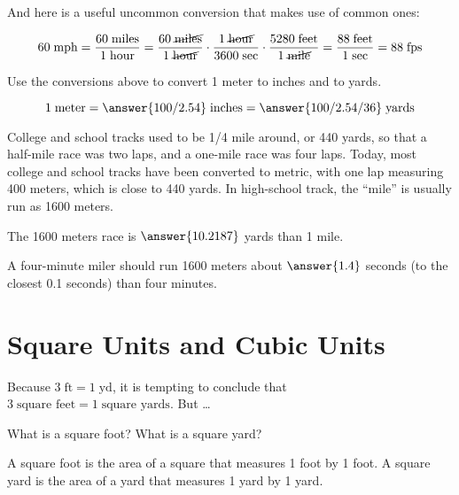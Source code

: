 \documentclass[nooutcomes]{ximera}
\begin{document}
And here is a useful uncommon conversion that makes use of common ones: 

\[
60\;\textrm{mph} = \frac{60\;\textrm{miles}}{1\;\textrm{hour}} 
=  \frac{60\;\cancel{\textrm{miles}}}{1\;\cancel{\textrm{hour}}} \cdot \frac{1\;\cancel{\textrm{hour}}}{3600\;\textrm{sec}} \cdot 
\frac{5280\;\textrm{feet}}{{1\;\cancel{\textrm{mile}}}} = \frac{88\;\textrm{feet}}{1\;\textrm{sec}} = 88\;\textrm{fps}
\]

\begin{question}
Use the conversions above to convert 1 meter to inches and to yards. 

\[
1\;\textrm{meter} = \answer{100/2.54}\;\textrm{inches} = \answer{100/2.54/36}\;\textrm{yards}
\] 

\end{question}

\begin{question}
College and school tracks used to be 1/4 mile around, or 440 yards, so that a half-mile race was two laps, and a one-mile race was four laps.  Today, most college and school tracks have been converted to metric, with one lap measuring 400 meters, which is close to 440 yards.  In high-school track, the ``mile'' is usually run as 1600 meters.  

The 1600 meters race is $\answer{10.2187}$ yards  than 1 mile.  

A four-minute miler should run 1600 meters about $\answer{1.4}$ seconds (to the closest 0.1 seconds)  than four minutes.  
\end{question}


\section{Square Units and Cubic Units}
Because $3\;\textrm{ft} = 1 \;\textrm{yd}$, it is tempting to conclude that $3\;\textrm{square feet} = 1 \;\textrm{square yards}$.  But \dots

\begin{question}
What is a square foot?  What is a square yard? 
\begin{freeResponse}
\begin{hint}
A square foot is the area of a square that measures 1 foot by 1 foot.  A square yard is the area of a yard that measures 1 yard by 1 yard. 
\end{hint}
\end{freeResponse}
\end{question}
\end{document}
